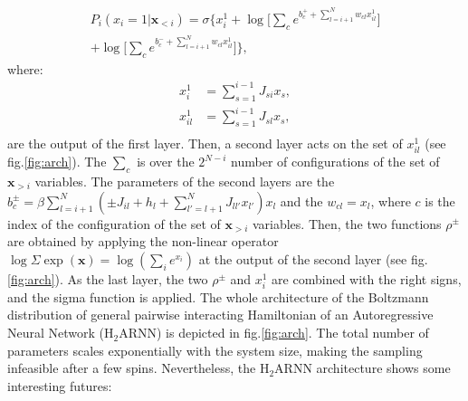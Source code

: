 \documentclass[aps,physrev,10pt,floatfix,reprint]{revtex4-2}
\begin{document}
\begin{multline}
        P_i\left(x_i=1 | \mathbf{x}_{<i}\right) = 
     \sigma \bigg\{ x_i^1+ 
     \log\big[ \sum_{c} e^{b_c^+ + \sum_{l=i+1}^{N} w_{cl} x_{il}^1}\big]\\
     +\log\big[ \sum_{c} e^{b_c^- + \sum_{l=i+1}^{N} w_{cl} x_{il}^1}\big] \bigg\},
\end{multline}
where:
\begin{align}
    \label{eq:x_i_first}
    x_i^1 &= \sum_{s=1}^{i-1} J_{si} x_s,\\
    x_{il}^1 &= \sum_{s=1}^{i-1} J_{sl} x_s,\\
\end{align}
 are the output of the first layer. 
Then, a second layer acts on the set of $x_{il}^1$ (see fig.\ref{fig:arch}). The $\sum_{c}$ is over the $2^{N-i}$ number of configurations of the set of $\mathbf{x}_{>i}$ variables. 
The parameters of the second layers are the $b_c^{\pm} = \beta\sum_{l=i+1}^N (\pm J_{il} + h_l + \sum_{l'=l+1}^N J_{ll'}x_{l'}) x_l $ and the $w_{cl}=x_l$, where $c$ is the index of the configuration of the set of $\mathbf{x}_{>i}$ variables. Then, the two functions $\rho^{\pm}$ are obtained by applying the non-linear operator $\log \Sigma \exp (\mathbf{x}) = \log(\sum_i e^{x_i})$ at the output of the second layer (see fig.\ref{fig:arch}). 
As the last layer, the two $\rho^{\pm}$ and $x_i^1$ are combined with the right signs, and the sigma function is applied. The whole architecture of the Boltzmann distribution of general pairwise interacting Hamiltonian of an Autoregressive Neural Network ($\text{H}_2\text{ARNN}$) is depicted in fig.\ref{fig:arch}. The total number of parameters scales exponentially with the system size, making the sampling infeasible after a few spins.
Nevertheless, the $\text{H}_2\text{ARNN}$ architecture shows some interesting futures:
\end{document}
